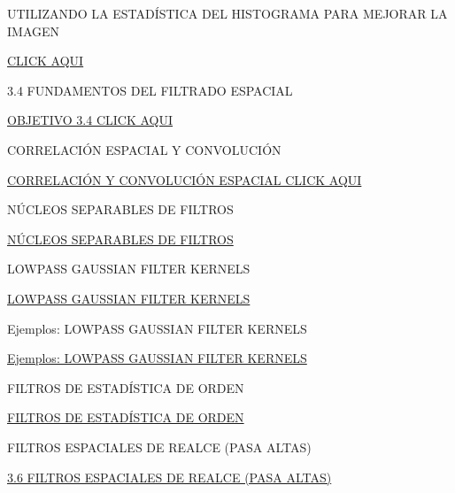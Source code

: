 \documentclass{beamer}
\begin{document}
\begin{frame}[fragile]{UTILIZANDO LA ESTADÍSTICA DEL HISTOGRAMA PARA MEJORAR LA IMAGEN}

\href{run:Tema_pag_150_p1.html}{CLICK AQUI}

\end{frame}


\begin{frame}[fragile]{3.4 FUNDAMENTOS DEL FILTRADO ESPACIAL}

\href{run:Tema_3_4_p1.html}{OBJETIVO 3.4 CLICK AQUI}

\end{frame}

\begin{frame}[fragile]{CORRELACIÓN ESPACIAL Y CONVOLUCIÓN}

\href{run:Tema_3_4_pag_154_p1.html}{CORRELACIÓN Y CONVOLUCIÓN ESPACIAL CLICK AQUI}

\end{frame}

\begin{frame}[fragile]{NÚCLEOS SEPARABLES DE FILTROS}

\href{run:Tema_3_4_pag_161_p1.html}{NÚCLEOS SEPARABLES DE FILTROS}

\end{frame}


\begin{frame}[fragile]{LOWPASS GAUSSIAN FILTER KERNELS}

\href{run:Tema_3_4_pag_166_p1.html}{LOWPASS GAUSSIAN FILTER KERNELS}

\end{frame}

\begin{frame}[fragile]{Ejemplos: LOWPASS GAUSSIAN FILTER KERNELS}

\href{run:Tema_3_4_pag_169_p1.html}{Ejemplos: LOWPASS GAUSSIAN FILTER KERNELS}

\end{frame}

\begin{frame}[fragile]{FILTROS DE ESTADÍSTICA DE ORDEN}

\href{run:Tema_3_4_pag_174_p1.html}{FILTROS DE ESTADÍSTICA DE ORDEN}

\end{frame}

\begin{frame}[fragile]{FILTROS ESPACIALES DE REALCE (PASA ALTAS)}

\href{run:Tema_3_6_p1.html}{3.6 FILTROS ESPACIALES DE REALCE (PASA ALTAS)}

\end{frame}
\end{document}
